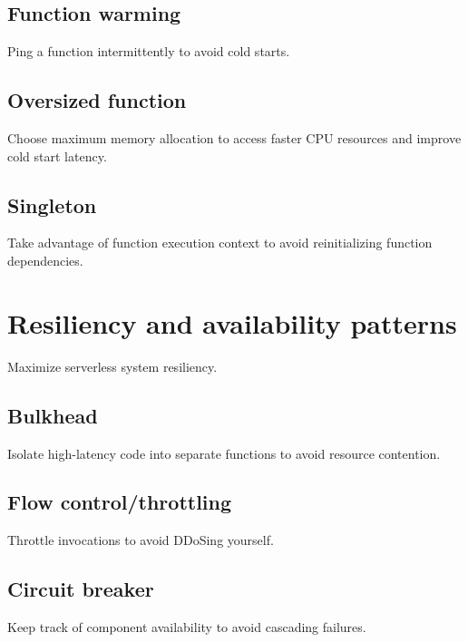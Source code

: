 \subsection{Function warming} \label{subsec:FunctionWarming}

Ping a function intermittently to avoid cold starts.

\subsection{Oversized function} \label{subsec:OversizedFunction}

Choose maximum memory allocation to access faster CPU resources and improve cold start latency.

\subsection{Singleton} \label{subsec:Singleton}

Take advantage of function execution context to avoid reinitializing function dependencies.

\section{Resiliency and availability patterns} \label{sec:resiliencyPatterns}

Maximize serverless system resiliency.

\subsection{Bulkhead} \label{subsec:Bulkhead}

Isolate high-latency code into separate functions to avoid resource contention.

\subsection{Flow control/throttling} \label{subsec:Flow control/throttling}

Throttle invocations to avoid DDoSing yourself.

\subsection{Circuit breaker} \label{subsec:Circuit breaker}

Keep track of component availability to avoid cascading failures.

